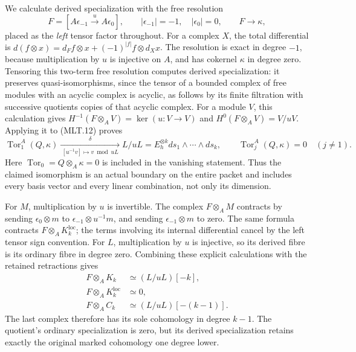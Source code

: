 We calculate derived specialization with the free
resolution
\[
 F=[A\epsilon_{-1}\xrightarrow{\ u\ }A\epsilon_0],
 \qquad |\epsilon_{-1}|=-1,\quad|\epsilon_0|=0,
 \qquad F\longrightarrow\kappa,                          \tag{MLT.13}
\]
placed as the \emph{left} tensor factor throughout.
For a complex \(X\), the total differential is
\(d(f\otimes x)=d_Ff\otimes x+(-1)^{|f|}f\otimes d_Xx\).
The resolution is exact in degree \(-1\), because
multiplication by \(u\) is injective on \(A\), and
has cokernel \(\kappa\) in degree zero. Tensoring
this two-term free resolution computes derived
specialization: it preserves quasi-isomorphisms,
since the tensor of a bounded complex of free
modules with an acyclic complex is acyclic, as
follows by its finite filtration with successive
quotients copies of that acyclic complex.
For a module \(V\), this calculation gives
\(H^{-1}(F\otimes_A V)=\ker(u:V\to V)\) and
\(H^0(F\otimes_A V)=V/uV\). Applying it to
(MLT.12) proves
\[
 \operatorname{Tor}_1^A(Q,\kappa)
   \xrightarrow[\ [u^{-1}v]\mapsto v\bmod uL\ ]{\ \delta\ }
   L/uL
   =E_h^{\otimes k}ds_1\wedge\cdots\wedge ds_k,\qquad
 \operatorname{Tor}_j^A(Q,\kappa)=0\quad(j\ne1).
                                                               \tag{MLT.14}
\]
Here \(\operatorname{Tor}_0=Q\otimes_A\kappa=0\)
is included in the vanishing statement.
Thus the claimed isomorphism is an actual boundary
on the entire packet and includes every basis vector
and every linear combination, not only its dimension.

For \(M\), multiplication by \(u\) is invertible.
The complex \(F\otimes_A M\) contracts by sending
\(\epsilon_0\otimes m\) to
\(\epsilon_{-1}\otimes u^{-1}m\), and sending
\(\epsilon_{-1}\otimes m\) to zero. The same formula
contracts \(F\otimes_A K_k^{\mathrm{loc}}\);
the terms involving its internal differential
cancel by the left tensor sign convention.
For \(L\), multiplication by \(u\) is injective,
so its derived fibre is its ordinary fibre in
degree zero. Combining these explicit calculations
with the retained retractions gives
\[
 \begin{aligned}
 F\otimes_A K_k&\simeq (L/uL)[-k],\\
 F\otimes_A K_k^{\mathrm{loc}}&\simeq0,\\
 F\otimes_A C_k&\simeq (L/uL)[-(k-1)].
 \end{aligned}                                           \tag{MLT.15}
\]
The last complex therefore has its sole cohomology
in degree \(k-1\). The quotient's ordinary
specialization is zero, but its derived
specialization retains exactly the original marked
cohomology one degree lower.

